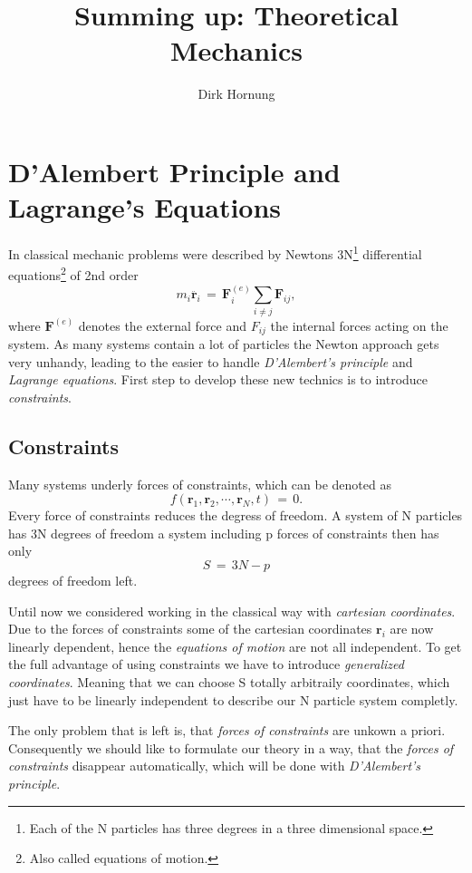 \documentclass{report}
\author{Dirk Hornung}
\title{Summing up: Theoretical Mechanics}
\renewcommand{\vec}[1]{\mathbf{#1}}
\begin{document}
\maketitle

\chapter{D'Alembert Principle and Lagrange's Equations}
In classical mechanic problems were described by Newtons 3N\footnote{Each of
the N particles has three degrees in a three dimensional space.} differential
equations\footnote{Also called equations of motion.} of 2nd order 
\begin{equation}
  m_i \ddot{\vec r_i} \,=\, \vec F_i^{(e)} \sum_{i \neq j} \vec F_{ij},
\end{equation}
where $\vec F^{(e)}$ denotes the external force and $F_{ij}$ the internal forces
acting on the system. As many systems contain a lot of particles the Newton
approach gets very unhandy, leading to the easier to handle \textit{D'Alembert's
principle} and \textit{Lagrange equations}. First step to develop these new
technics is to introduce \textit{constraints}. 

\section{Constraints}
Many systems underly forces of constraints, which can be denoted as 
\begin{equation}
  \label{holonomicConstraint}
  f(\vec r_1, \vec r_2, \cdots, \vec r_N, t) \,=\, 0.
\end{equation}
Every force of constraints reduces the degress of freedom. A system of N
particles has 3N degrees of freedom a system including p forces of
constraints then has only
\begin{equation}
  S \,=\, 3N - p
\end{equation}
degrees of freedom left. 

Until now we considered working in the classical way with \textit{cartesian
coordinates}. Due to the forces of constraints some of the cartesian coordinates $\vec
r_i$ are now linearly dependent, hence the \textit{equations of motion} are not
all independent. To get the full advantage of using constraints we have to
introduce \textit{generalized coordinates}. Meaning that we can choose S
totally arbitraily coordinates, which just have to be linearly
independent to describe our N particle system completly. 

The only problem that is left is, that \textit{forces of constraints} are
unkown a priori. Consequently we should like to formulate our theory in a way,
that the \textit{forces of constraints} disappear automatically, which will be 
done with \textit{D'Alembert's principle}. 
\end{document}
